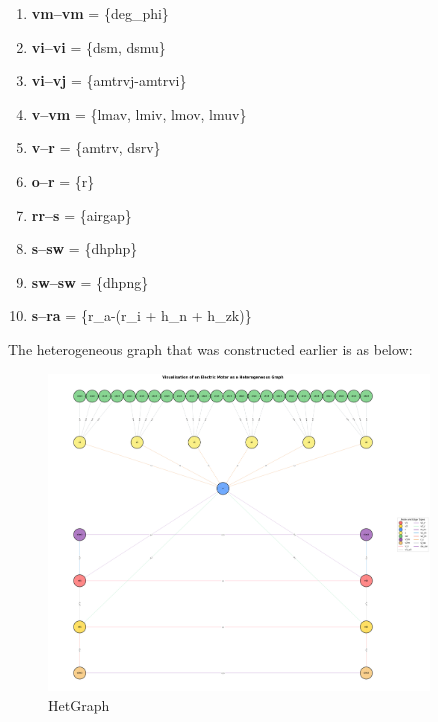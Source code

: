 \documentclass{report} %
\begin{document}
\begin{enumerate}

    \item \textbf{vm--vm} = \{deg\_phi\}

    \item \textbf{vi--vi} = \{dsm, dsmu\}

    \item \textbf{vi--vj} = \{amtrvj-amtrvi\}

    \item \textbf{v--vm} = \{lmav, lmiv, lmov, lmuv\}

    \item \textbf{v--r} = \{amtrv, dsrv\}
    
    \item \textbf{o--r} = \{r\}

    \item \textbf{rr--s} = \{airgap\}

    \item \textbf{s--sw} = \{dhphp\}
    
    \item \textbf{sw--sw} = \{dhpng\}
    
    \item \textbf{s--ra} = \{r\_a-(r\_i + h\_n + h\_zk)\}
    
\end{enumerate}
The heterogeneous graph that was constructed earlier is as below:
\begin{figure}[h]
    \centering
    \includegraphics[width=0.9\textwidth]{./ReportImages/graph.png} 
    \caption{HetGraph}
    \label{fig:Graph}
\end{figure}
\end{document}
